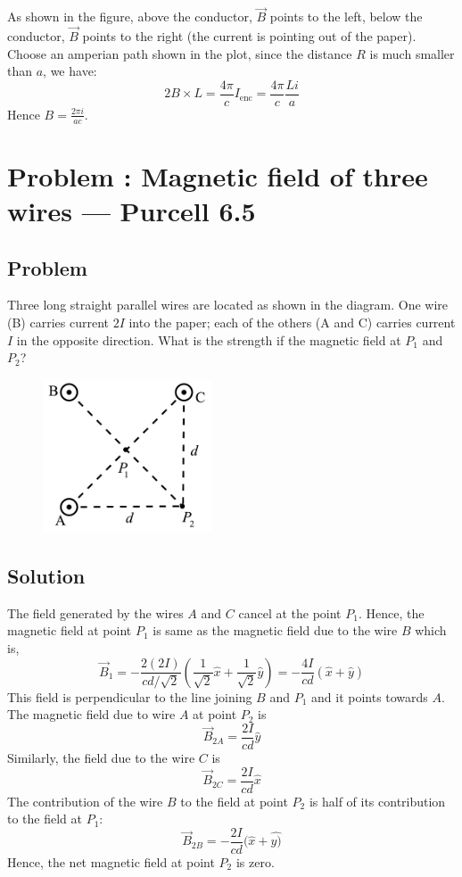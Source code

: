 \documentclass[solutions]{esg8022pset}
\begin{document}
  As shown in the figure, above the conductor, $\vec{B}$ points to the left,
  below the conductor, $\vec{B}$  points to the right (the current is pointing
  out of the paper).  Choose an amperian path shown in the plot, since the
  distance $R$ is much smaller than $a$, we have:
  \begin{equation}
    2B \times L = \frac{4 \pi}{c} I_{\text{enc}} = \frac{4 \pi}{c} \frac{L i}{a}
  \end{equation}
  Hence $B=\frac{2 \pi i}{a c}$.
\section{Problem \thesection: Magnetic field of three wires --- Purcell 6.5}
\subsection{Problem}
Three long straight parallel wires are located as shown in the diagram. One wire (B) carries current $2 I$ into the paper;
 each of the others (A and C) carries current $I$ in the opposite direction. What is the strength if the magnetic field at $P_1$
  and $P_{2}$?

   \begin{figure}[ht]
    \centering
    \includegraphics[width = 5cm]{Threewires}
    \label{fig:threewire}
  \end{figure}

\subsection{Solution}
The field generated by the wires $A$ and $C$ cancel at the point $P_{1}$. Hence, the magnetic field at point $P_{1}$ is same as the magnetic field due to the wire $B$ which is,
$$\vec{B}_{1} = -\frac{2 (2I)}{ c d/\sqrt{2}} \left( \frac{1}{\sqrt{2} } \hat{x}+\frac{1}{\sqrt{2} } \hat{y} \right) = -\frac{4I}{cd} ( \hat{x} +  \hat{y})$$
This field is perpendicular to the line joining $B$ and $P_{1}$ and it points towards $A$.\\
\noindent  The magnetic field due to wire $A$ at point $P_{2}$ is
$$\vec{B}_{2A} =\frac {2 I}{cd}  \hat{y}$$
Similarly, the field due to the wire $C$ is
$$\vec{B}_{2C} = \frac{2 I}{cd}  \hat{x}$$
The contribution of the wire $B$ to the field at point $P_{2}$ is half of its contribution to the field at $P_{1}$:
$$\vec{B}_{2B} =  -\frac{2I}{cd} ( \hat{x} +  \hat{y)}$$
Hence, the net magnetic field at point $P_{2}$ is zero.
\end{document}

